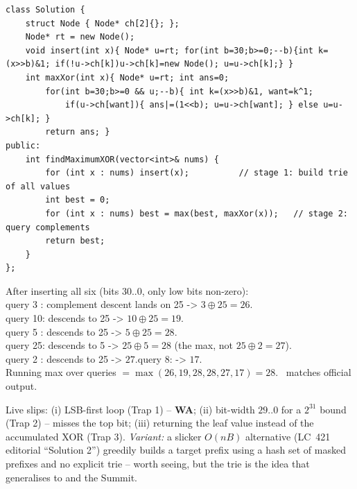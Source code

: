 \begin{lstlisting}[caption={LeetCode 421 -- insert all values, then max-query each against the binary trie}, label={lst:c08-maxxor-soln}]
class Solution {
    struct Node { Node* ch[2]{}; };
    Node* rt = new Node();
    void insert(int x){ Node* u=rt; for(int b=30;b>=0;--b){int k=(x>>b)&1; if(!u->ch[k])u->ch[k]=new Node(); u=u->ch[k];} }
    int maxXor(int x){ Node* u=rt; int ans=0;
        for(int b=30;b>=0 && u;--b){ int k=(x>>b)&1, want=k^1;
            if(u->ch[want]){ ans|=(1<<b); u=u->ch[want]; } else u=u->ch[k]; }
        return ans; }
public:
    int findMaximumXOR(vector<int>& nums) {
        for (int x : nums) insert(x);          // stage 1: build trie of all values
        int best = 0;
        for (int x : nums) best = max(best, maxXor(x));   // stage 2: query complements
        return best;
    }
};
\end{lstlisting}

\begin{tracebox}[Official sample: nums = (3,10,5,25,2,8) -> 28]
After inserting all six (bits 30..0, only low bits non-zero):\\
query 3 : complement descent lands on 25 -> $3\oplus 25 = 26$.\\
query 10: descends to 25 -> $10\oplus 25 = 19$.\\
query 5 : descends to 25 -> $5\oplus 25 = 28$.\\
query 25: descends to 5 -> $25\oplus 5 = 28$ (the max, not $25\oplus 2 = 27$).\\
query 2 : descends to 25 -> $27$.\quad query 8: -> $17$.\\
Running max over queries $=\max(26,19,28,28,27,17)=28$. \checkmark\ matches official output.
\end{tracebox}


\begin{warningbox}
Live slips: (i) LSB-first loop (Trap 1) -- \textbf{WA}; (ii) bit-width $29..0$ for a $2^{31}$ bound
(Trap 2) -- misses the top bit; (iii) returning the leaf value instead of the accumulated XOR (Trap 3).
\emph{Variant:} a slicker $O(nB)$ alternative (LC~421 editorial ``Solution 2'') greedily builds a target
prefix using a hash set of masked prefixes and no explicit trie -- worth seeing, but the trie is the idea
that generalises to  and the Summit.
\end{warningbox}

